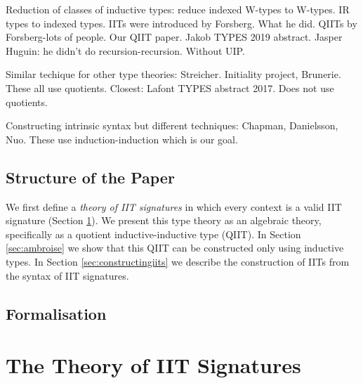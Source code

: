 \documentclass[a4paper,UKenglish,cleveref, autoref]{lipics-v2019}
\begin{document}
Reduction of classes of inductive types: reduce indexed W-types to
W-types. IR types to indexed types. IITs were introduced by
Forsberg. What he did.  QIITs by Forsberg-lots of people. Our QIIT
paper. Jakob TYPES 2019 abstract.  Jasper Huguin: he didn't do
recursion-recursion. Without UIP.

Similar techique for other type theories: Streicher. Initiality
project, Brunerie. These all use quotients. Closest: Lafont TYPES
abstract 2017. Does not use quotients.

Constructing intrinsic syntax but different techniques: Chapman,
Danielsson, Nuo. These use induction-induction which is our goal.

\subsection{Structure of the Paper}

We first define a \emph{theory of IIT signatures} in which every context is a
valid IIT signature (Section \ref{sec:theory_of_signatures}). We present this
type theory as an algebraic \cite{ttintt} theory, specifically as a quotient
inductive-inductive type (QIIT). In Section \ref{sec:ambroise} we show that this
QIIT can be constructed only using inductive types. In Section
\ref{sec:constructingiits} we describe the construction of IITs from the syntax
of IIT signatures.

\subsection{Formalisation}


\section{The Theory of IIT Signatures}
\label{sec:theory_of_signatures}
\end{document}
